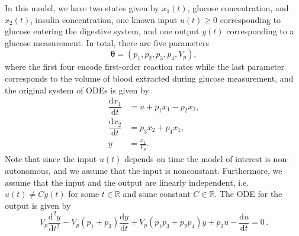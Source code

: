 \documentclass[12pt]{article}
\begin{document}
{In this model, we have two states given by $x_{1}(t)$, glucose concentration, and $x_{2}(t)$, insulin concentration, one known input $u(t)\geq{0}$ corresponding to glucose entering the digestive system, and one output $y(t)$ corresponding to a glucose measurement. In total, there are five parameters
\begin{equation}
\boldsymbol{\theta}=(p_{1},p_{2},p_{3},p_{4},V_{p}),
\label{eq:theta_glucose}
\end{equation}
where the first four encode first-order reaction rates while the last parameter corresponds to the volume of blood extracted during glucose measurement, and the original system of ODEs is given by
\begin{equation}
\begin{split}
    \dfrac{\mathrm{d}x_{1}}{\mathrm{d}t}&=u+p_{1}x_{1}-p_{2}x_{2},\\
    \dfrac{\mathrm{d}x_{2}}{\mathrm{d}t}&=p_{3}x_{2}+p_{4}x_{1},\\
    y&=\frac{x_{1}}{V_{p}}.
\end{split}
\end{equation}
Note that since the input $u(t)$ depends on time the model of interest is non-autonomous, and we assume that the input is nonconstant. Furthermore, we assume that the input and the output are linearly independent, i.e. $u(t)\neq{C}y(t)$ for some $t\in\mathbb{R}$ and some constant $C\in\mathbb{R}$. The ODE for the output is given by
\begin{equation}
V_{p} \dfrac{\mathrm{d}^{2}y}{\mathrm{d}t^{2}} - V_{p}(p_{1} +p_{3}) \dfrac{\mathrm{d}y}{\mathrm{d}t} + V_{p}(p_{1}p_{3}+p_{2}p_{4})y+p_{3}u-\dfrac{\mathrm{d}u}{\mathrm{d}t}=0\,.
    \label{eq:glucose_ODE_output}
\end{equation}
}
\end{document}
